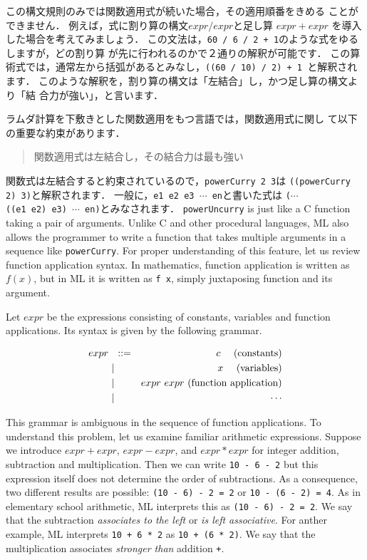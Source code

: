 \documentclass{jbook}
\newcommand{\vbar}{\mbox{\ $|$\ }}
\newcommand{\myem}{\mbox{\ \ }}
\begin{document}
	この構文規則のみでは関数適用式が続いた場合，その適用順番をきめる
ことができません．
	例えば，式に割り算の構文$expr / expr$と足し算
$expr + expr$
を導入した場合を考えてみましょう．
	この文法は，{\tt 60 / 6 / 2 + 1}のような式をゆるしますが，どの割り算
が先に行われるのかで２通りの解釈が可能です．
	この算術式では，通常左から括弧があるとみなし，{\tt ((60 / 10) /
2) + 1 }と解釈されます．
	このような解釈を，割り算の構文は「左結合」し，かつ足し算の構文より「結
合力が強い」，と言います．

	ラムダ計算を下敷きとした関数適用をもつ言語では，関数適用式に関し
て以下の重要な約束があります．
\begin{quote}
関数適用式は左結合し，その結合力は最も強い
\end{quote}
	関数式は左結合すると約束されているので，{\tt powerCurry 2 3}は
{\tt ((powerCurry 2) 3)}と解釈されます．
	一般に，{\tt e1\ e2\ e3\ $\cdots$\ en}と書いた式は
{\tt ($\cdots$ ((e1\ e2)\ e3)\ $\cdots$\ en)}とみなされます．
\else%
	{\tt powerUncurry} is just like a C function taking a pair of
arguments.
	Unlike C and other procedural languages, ML also allows the
programmer to write a function that takes multiple arguments in a
sequence like {\tt powerCurry}.
	For proper understanding of this feature, let us review function
application syntax.
	In mathematics, function application is written as $f(x)$,
but in ML it is written as {\tt f x}, simply juxtaposing function and its
argument. 

	Let $expr$ be the expressions consisting of constants, variables
and function applications.
	Its syntax is given by the following grammar.
\begin{tt}
\begin{eqnarray*}
expr &\mbox{\ \ }::=& c                  \mbox{\myem\myem (constants)} \\
     &\vbar& x                    \mbox{\myem\myem (variables)} \\
     &\vbar& expr\mbox{\ } expr   \mbox{\ (function application)} \\
     &\vbar& \cdots
\end{eqnarray*}
\end{tt}

	This grammar is ambiguous in the sequence of function
applications.
	To understand this problem, let us examine familiar arithmetic
expressions.
	Suppose we introduce 
$expr + expr$,
$expr - expr$, and
$expr * expr$
for integer addition, subtraction and multiplication.
	Then we can write {\tt 10 - 6 - 2} but this expression
itself does not determine the order of subtractions.
	As a consequence, two different results are possible:
{\tt (10 - 6) - 2 = 2} 
or
{\tt 10 - (6 - 2) = 4}.
	As in elementary school arithmetic, ML interprets this 
as {\tt (10 - 6) - 2 = 2}.
	We say that the subtraction {\em associates to the left} or
{\em is left associative}.
	For anther example, ML interprets {\tt 10 + 6 * 2} as {\tt 10
+ (6 * 2)}.
	We say that the multiplication {\tt *} associates {\em stronger
than} addition {\tt +}.
	
\end{document}
